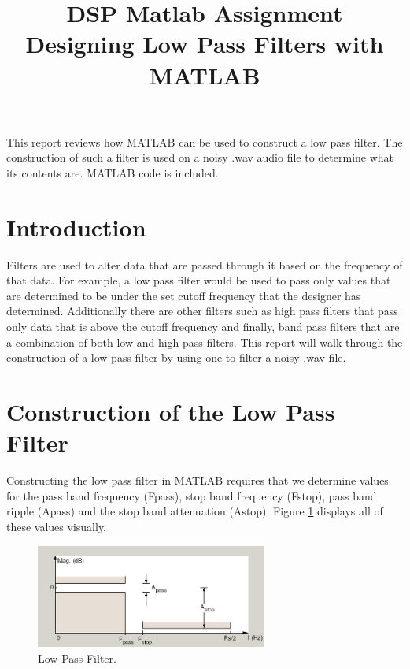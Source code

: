 \documentclass[conference]{IEEEtran}
\begin{document}
\title{DSP Matlab Assignment \\Designing Low Pass Filters with MATLAB}
\author{
}

\maketitle

\begin{abstract}


\end{abstract}
This report reviews how MATLAB can be used to construct a low pass filter. The construction of such a filter is used on a noisy .wav audio file to determine what its contents are. MATLAB code is included.

\section{Introduction}
Filters are used to alter data that are passed through it based on the frequency of that data. For example, a low pass filter would be used to pass only values that are determined to be under the set cutoff frequency that the designer has determined. Additionally there are other filters such as high pass filters that pass only data that is above the cutoff frequency and finally, band pass filters that are a combination of both low and high pass filters. This report will walk through the construction of a low pass filter by using one to filter a noisy .wav file.

\section{Construction of the Low Pass Filter}
Constructing the low pass filter in MATLAB requires that we determine values for the pass band frequency (Fpass), stop band frequency (Fstop), pass band ripple (Apass) and the stop band attenuation (Astop). Figure \ref{figure:filter} displays all of these values visually.

\begin{figure}[H]
\centering
\includegraphics[width=3.0in]{./figures/filter.png}
\caption{Low Pass Filter.}
\label{figure:filter}
\end{figure}
\end{document}

